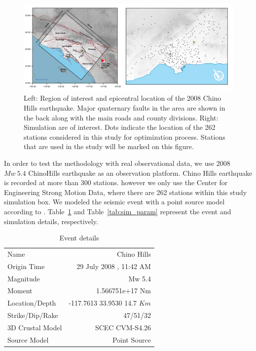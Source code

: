  \begin{figure}[ht]
    \centering
    \includegraphics[width=\textwidth]{figures/pdf/Figure_08.pdf}
    \caption{Left: Region of interest and epicentral location of the 2008 Chino Hills earthquake. Major quaternary faults in the area are shown in the back along with the main roads and county divisions. Right: Simulation are of interest. Dots indicate the location of the 262 stations considered in this study for optimization process. {\color{red} Stations that are used in the study will be marked on this figure.}}
    \label{fig:Figure_stations}
\end{figure}

In order to test the methodology with real observational data, we use 2008 $Mw~5.4$  ChinoHills earthquake as an observation platform. Chino Hills earthquake is recorded at more than 300 stations. however we only use the Center for Engineering Strong Motion Data, where there are 262 stations within this study simulation box. We modeled the seismic event with a point source model according to \citep{Taborda_2016_GJI}. Table~\ref{tab:event_details}  and Table~\ref{tab:sim_param} represent the event and simulation details, respectively. 


\begin{table}[ht]
\centering
\caption{Event details}
\label{tab:event_details}
\renewcommand{\arraystretch}{0.75}
\begin{tabular}{lr}
\\ \hline
Name                                 &   Chino Hills                          \\
Origin Time                        & 29 July 2008 , 11:42 AM             \\
Magnitude                          &  Mw 5.4            \\
Moment                             & 1.566751e+17 Nm             \\
Location/Depth                  &  -117.7613 33.9530 14.7 $Km$    \\
Strike/Dip/Rake                 & 47/51/32                                   \\
3D Crustal Model              & SCEC CVM-S4.26                   \\
Source Model                   & Point Source                                  \\ \hline
\end{tabular}
\end{table}


